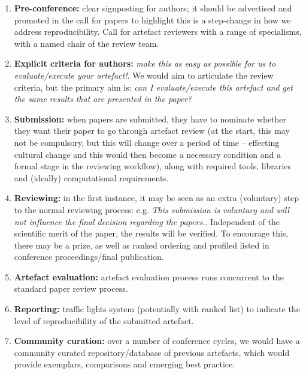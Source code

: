 \documentclass[conference]{IEEEtran}
\begin{document}
\begin{enumerate}
\item {\textbf{Pre-conference:}} clear signposting for authors; it
should be advertised and promoted in the call for papers to
highlight this is a step-change in how we address
reproducibility. Call for artefact reviewers with a range of
specialisms, with a named chair of the review team.
\item {\textbf{Explicit criteria for authors:}} {\emph{make this as
easy as possible for us to evaluate/execute your artefact!}}. We would
aim to articulate the review criteria, but the primary aim is:
{\emph{can I evaluate/execute this artefact and get the same results
that are presented in the paper?}}
\item {\textbf{Submission:}} when papers are submitted, they have to
nominate whether they want their paper to go through artefact review
(at the start, this may not be compulsory, but this will change over a
period of time -- effecting cultural change and this would then become
a necessary condition and a formal stage in the reviewing workflow),
along with required tools, libraries and (ideally) computational
requirements.
\item {\textbf{Reviewing:}} in the first instance, it may be seen as
an extra (voluntary) step to the normal reviewing process:
e.g. {\emph{This submission is voluntary and will not influence the
final decision regarding the papers.}}. Independent of the scientific
merit of the paper, the results will be verified. To encourage this,
there may be a prize, as well as ranked ordering and profiled listed
in conference proceedings/final publication.
\item {\textbf{Artefact evaluation:}} artefact evaluation process runs
concurrent to the standard paper review process.
\item {\textbf{Reporting:}} traffic lights system (potentially with
ranked list) to indicate the level of reproducibility of the submitted
artefact.
\item {\textbf{Community curation:}} over a number of conference
  cycles, we would have a community curated repository/database of
  previous artefacts, which would provide exemplars, comparisons and
  emerging best practice.
\end{enumerate}
\end{document}
